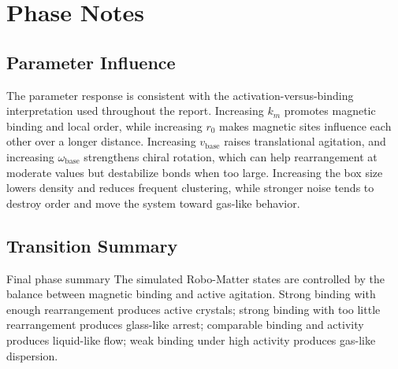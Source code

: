 \documentclass[12pt,a4paper,oneside]{report}
\begin{document}
\chapter{Phase Notes}

\section{Parameter Influence}
The parameter response is consistent with the activation-versus-binding interpretation used throughout the report. Increasing $k_m$ promotes magnetic binding and local order, while increasing $r_0$ makes magnetic sites influence each other over a longer distance. Increasing $v_{\mathrm{base}}$ raises translational agitation, and increasing $\omega_{\mathrm{base}}$ strengthens chiral rotation, which can help rearrangement at moderate values but destabilize bonds when too large. Increasing the box size lowers density and reduces frequent clustering, while stronger noise tends to destroy order and move the system toward gas-like behavior.

\section{Transition Summary}
\begin{resultbox}{Final phase summary}
The simulated Robo-Matter states are controlled by the balance between magnetic binding and active agitation. Strong binding with enough rearrangement produces active crystals; strong binding with too little rearrangement produces glass-like arrest; comparable binding and activity produces liquid-like flow; weak binding under high activity produces gas-like dispersion.
\end{resultbox}
\end{document}
